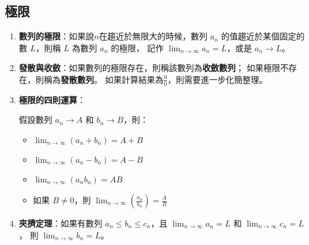 \documentclass[12pt]{article}
\begin{document}
\begin{tcolorbox}[colframe=black!60!blue, colback=blue!5!white, arc=4pt, boxrule=1pt]
\section{極限}
\begin{enumerate}
    \item \textbf{數列的極限}：如果說$n$在趨近於無限大的時候，數列 $a_n$ 
    的值趨近於某個固定的數 $L$，則稱 $L$ 為數列 $a_n$ 的極限，
    記作 $\displaystyle\lim_{n \to \infty} a_n = L$，或是 $a_n \to L$。
    \item \textbf{發散與收斂}：如果數列的極限存在，則稱該數列為\textbf{收斂數列}；
    如果極限不存在，則稱為\textbf{發散數列}。
    如果計算結果為$\frac{0}{0}$，則需要進一步化簡整理。
    \item \textbf{極限的四則運算}：
    
    假設數列 $a_n \to A$ 和 $b_n \to B$，則：
    \begin{itemize}
        \item $\displaystyle\lim_{n \to \infty} (a_n + b_n) = A + B$
        \item $\displaystyle\lim_{n \to \infty} (a_n - b_n) = A - B$
        \item $\displaystyle\lim_{n \to \infty} (a_n b_n) = AB$
        \item 如果 $B \neq 0$，則 $\displaystyle\lim_{n \to \infty} \left(\frac{a_n}{b_n}\right) = \frac{A}{B}$
    \end{itemize}
    \item \textbf{夾擠定理}：如果有數列 $a_n \leq b_n \leq c_n$，且 $\displaystyle\lim_{n \to \infty} a_n = L$ 和 $\displaystyle\lim_{n \to \infty} c_n = L$，
    則 $\displaystyle\lim_{n \to \infty} b_n = L$。
\end{enumerate}

\end{tcolorbox}
\end{document}
